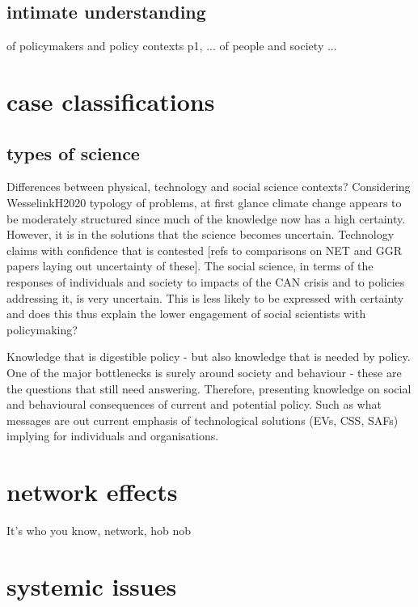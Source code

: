 \subsection{intimate understanding}
of policymakers and policy contexts p1, ...
of people and society ...


\section{case classifications}
\subsection{types of science}
Differences between physical, technology and social science contexts?
Considering WesselinkH2020 typology of problems, at first glance climate change appears to be moderately structured since much of the knowledge now has a high certainty. However, it is in the solutions that the science becomes uncertain. Technology claims with confidence that is contested [refs to comparisons on NET and GGR papers laying out uncertainty of these]. The social science, in terms of the responses of individuals and society to impacts of the CAN crisis and to policies addressing it, is very uncertain. This is less likely to be expressed with certainty and does this thus explain the lower engagement of social scientists with policymaking?

Knowledge that is digestible policy - but also knowledge that is needed by policy. One of the major bottlenecks is surely around society and behaviour - these are the questions that still need answering. Therefore, presenting knowledge on social and behavioural consequences of current and potential policy. Such as what messages are out current emphasis of technological solutions (EVs, CSS, SAFs) implying for individuals and organisations.

\section{network effects}
It's who you know, network, hob nob


\section{systemic issues}

